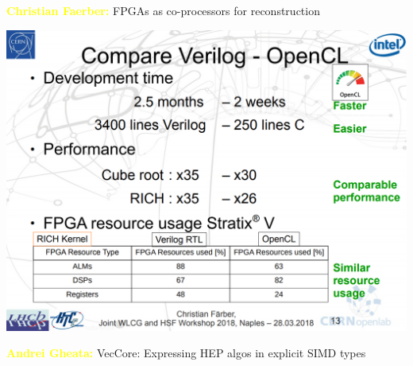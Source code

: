 \documentclass[aspectratio=169]{beamer}
\begin{document}
\begin{frame}{\textcolor{yellow}{\bf Christian Faerber:} FPGAs as co-processors for reconstruction}
\vspace{0.13 cm}
\begin{center}
\includegraphics[width=0.73\linewidth]{fpgas-3.png}
\end{center}
\end{frame}

\begin{frame}{\textcolor{yellow}{\bf Andrei Gheata:} VecCore: Expressing HEP algos in explicit SIMD types}
\vspace{0.5 cm}
\end{frame}


\end{document}
